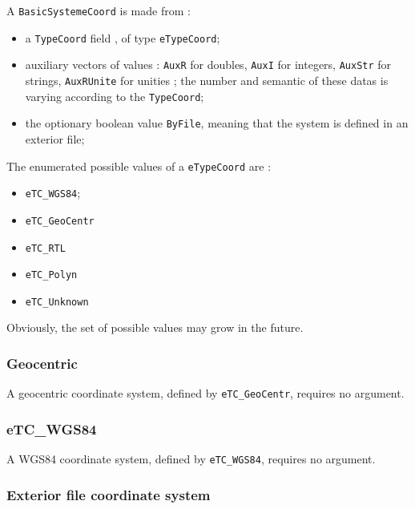 A  {\tt BasicSystemeCoord}  is made from :

\begin{itemize}
   \item  a {\tt TypeCoord}  field , of type {\tt eTypeCoord};
   \item auxiliary vectors of values : {\tt AuxR} for doubles, {\tt AuxI} for integers,
         {\tt AuxStr} for strings, {\tt AuxRUnite} for unities ; the  number and semantic of these datas is
         varying according  to  the  {\tt TypeCoord};

    \item the optionary boolean value {\tt ByFile}, meaning that the system is defined in an exterior file;

\end{itemize}

The enumerated possible values of a {\tt eTypeCoord} are :

\begin{itemize}
   \item  {\tt eTC\_WGS84};
   \item  {\tt eTC\_GeoCentr}
   \item  {\tt eTC\_RTL}
   \item  {\tt eTC\_Polyn}
   \item  {\tt eTC\_Unknown}
\end{itemize}

Obviously, the set of possible values may grow in the future.


\subsubsection{Geocentric}

A geocentric coordinate system, defined by  {\tt eTC\_GeoCentr}, requires no argument.

\subsubsection{eTC\_WGS84}

A WGS84 coordinate system, defined by  {\tt eTC\_WGS84}, requires no argument.


\subsubsection{Exterior file coordinate system}

